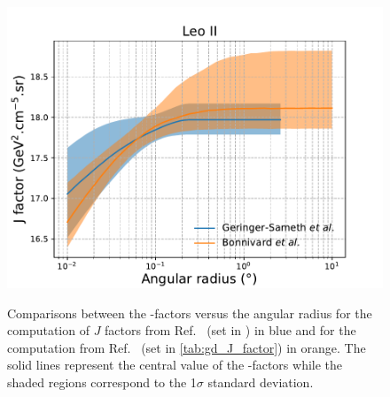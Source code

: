 \begin{figure}[ht]
{    \includegraphics[scale=0.32]{figures/glory_duck/appendix/LeoII.pdf}
    }
    \caption{Comparisons between the \J-factors versus the angular radius for the computation of $J$ factors from Ref.~\cite{Geringer-Sameth:2014yza} (\GS set in ) in blue and for the computation from Ref.~\cite{Bonnivard:2014kza, Bonnivard:2015xpq} (\B set in \cref{tab:gd_J_factor}) in orange. The solid lines represent the central value of the \J-factors while the shaded regions correspond to the 1$\sigma$ standard deviation.}
\label{fig:comparison_J_1}
\end{figure}

